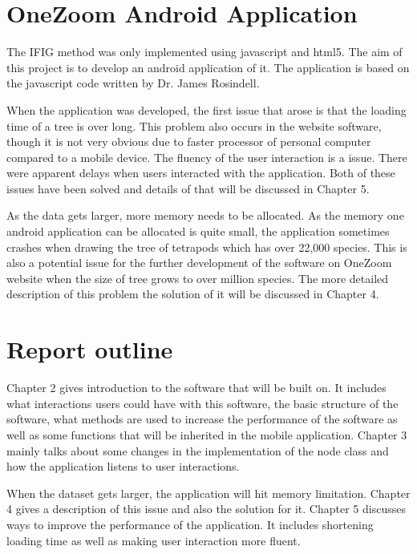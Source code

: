 \documentclass[MSc]{icldt}
\begin{document}
\section{OneZoom Android Application}

The IFIG method was only implemented using javascript and html5. The aim of this project is to develop an android application of it. The application is based on the javascript code written by Dr. James Rosindell. 

When the application was developed, the first issue that arose is that the loading time of a tree is over long. This problem also occurs in the website software, though it is not very obvious due to faster processor of personal computer compared to a mobile device. The fluency of the user interaction is a issue. There were apparent delays when users interacted with the application. Both of these issues have been solved and details of that will be discussed in Chapter 5.

As the data gets larger, more memory needs to be allocated. As the memory one android application can be allocated is quite small, the application sometimes crashes when drawing the tree of tetrapods which has over 22,000 species. This is also a potential issue for the further development of the software on OneZoom website when the size of tree grows to over million species. The more detailed description of this problem the solution of it will be discussed in Chapter 4.



\section{Report outline}

Chapter 2 gives introduction to the software that will be built on. It includes what interactions users could have with this software, the basic structure of the software, what methods are used to increase the performance of the software as well as some functions that will be inherited in the mobile application. Chapter 3 mainly talks about some changes in the implementation of the node class and how the application listens to user interactions. 

 When the dataset gets larger, the application will hit memory limitation. Chapter 4 gives a description of this issue and also the solution for it. Chapter 5 discusses ways to improve the performance of the application. It includes shortening loading time as well as making user interaction more fluent.
 
\end{document}
